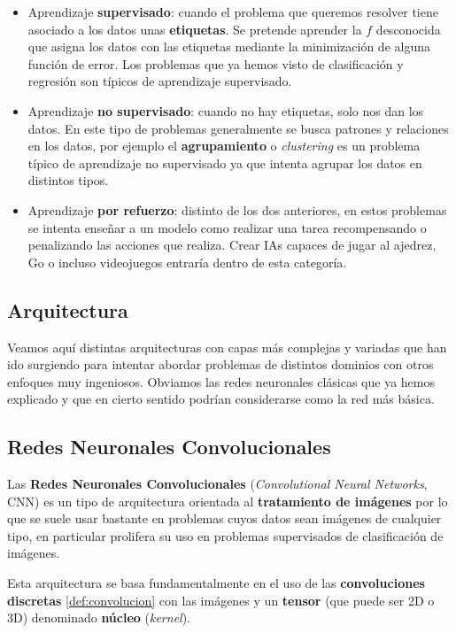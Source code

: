 \begin{itemize}
  \item Aprendizaje \textbf{supervisado}: cuando el problema que queremos resolver tiene asociado a los datos unas \textbf{etiquetas}. Se pretende aprender la $f$ desconocida que asigna los datos con las etiquetas mediante la minimización de alguna función de error. Los problemas que ya hemos visto de clasificación y regresión son típicos de aprendizaje supervisado.
  \item Aprendizaje \textbf{no supervisado}: cuando no hay etiquetas, solo nos dan los datos. En este tipo de problemas generalmente se busca patrones y relaciones en los datos, por ejemplo el \textbf{agrupamiento} o \emph{clustering} es un problema típico de aprendizaje no supervisado ya que intenta agrupar los datos en distintos tipos.
  \item Aprendizaje \textbf{por refuerzo}: distinto de los dos anteriores, en estos problemas se intenta enseñar a un modelo como realizar una tarea recompensando o penalizando las acciones que realiza. Crear IAs capaces de jugar al ajedrez, Go o incluso videojuegos entraría dentro de esta categoría.
\end{itemize}

\subsection{Arquitectura}

Veamos aquí distintas arquitecturas con capas más complejas y variadas que han ido surgiendo para intentar abordar problemas de distintos dominios con otros enfoques muy ingeniosos. Obviamos las redes neuronales clásicas que ya hemos explicado y que en cierto sentido podrían considerarse como la red más básica.

\subsection{Redes Neuronales Convolucionales}

Las \textbf{Redes Neuronales Convolucionales} (\emph{Convolutional Neural Networks}, CNN) \cite{lecun1995convolutional} es un tipo de arquitectura orientada al \textbf{tratamiento de imágenes} por lo que se suele usar bastante en problemas cuyos datos sean imágenes de cualquier tipo, en particular prolifera su uso en problemas supervisados de clasificación de imágenes.

Esta arquitectura se basa fundamentalmente en el uso de las \textbf{convoluciones discretas} \eqref{def:convolucion} con las imágenes y un \textbf{tensor} (que puede ser 2D o 3D) denominado \textbf{núcleo} (\emph{kernel}).

